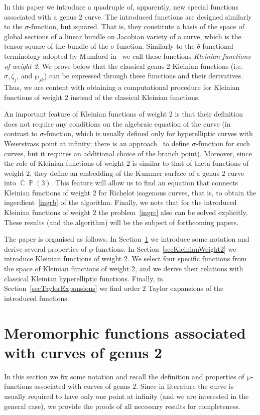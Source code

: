 \documentclass{amsart}
\numberwithin{equation}{section}
\theoremstyle{definition}
\theoremstyle{remark}
\DeclareMathOperator{\CC}{\mathbb C}
\DeclareMathOperator{\PP}{\mathbb P}
\begin{document}
	In this paper we introduce a quadruple of, apparently, new special functions associated with a genus $2$ curve. The introduced functions are designed similarly to the $\sigma$-function, but squared. That is, they constitute a basis of the space of global sections of a linear bundle on Jacobian variety of a curve, which is the tensor square of the bundle of the $\sigma$-function. Similarly to the $\theta$-functional terminology adopted by Mumford in~\cite{mumfordI} we call these functions {\it{Kleinian functions of weight 2}}. We prove below that the classical genus 2 Kleinian functions (i.e. $\sigma, \zeta_j$, and $\wp_{jk}$) can be expressed through these functions and their derivatives. Thus, we are content with obtaining a computational procedure for Kleinian functions of weight $2$ instead of the classical Kleinian functions.
	
	An important feature of Kleinian functions of weight $2$ is that their definition does not require any conditions on the algebraic equation of the curve (in contrast to $\sigma$-function, which is usually defined only for hyperelliptic curves with Weierstrass point at infinity; there is an approach~\cite{ayanoNonWeier} to define $\sigma$-function for such curves, but it requires an additional choice of the branch point). Moreover, since the role of Kleinian functions of weight $2$ is similar to that of theta-functions of weight $2$, they define an embedding of the Kummer surface of a genus $2$ curve into $\CC\PP(3)$. This feature will allow us to find an equation that connects Kleinian functions of weight $2$ for Richelot isogenous curves, that is, to obtain the ingerdient~\ref{ingrb} of the algorithm. Finally, we note that for the introduced Kleinian functions of weight $2$ the problem~\ref{ingrc} also can be solved explicitly. These results (and the algorithm) will be the subject of forthcoming papers.
	
	The paper is organised as follows. In Section~\ref{secSpecialMerFunctions} we introduce some notation and derive several properties of $\wp$-functions. In Section~\ref{secKleinianWeight2} we introduce Kleinian functions of weight 2. We select four specific functions from the space of Kleinian functions of weight 2, and we derive their relations with classical Kleinian hyperelliptic functions. Finally, in Section~\ref{secTaylorExpansions} we find order 2 Taylor expansions of the introduced functions.
	\section{Meromorphic functions associated with curves of genus 2}\label{secSpecialMerFunctions}
	In this section we fix some notation and recall the definition and properties of $\wp$-functions associated with curves of genus $2$. Since in literature the curve is usually required to have only one point at infinity (and we are interested in the general case), we provide the proofs of all necessary results for completeness.
\end{document}
